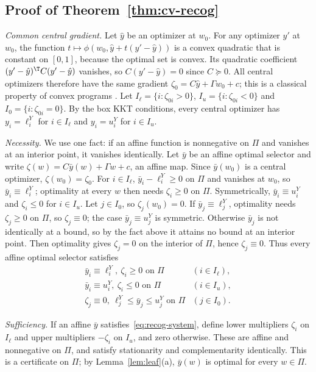 \subsection{Proof of Theorem~\ref{thm:cv-recog}}

\emph{Common central gradient.} Let $\hat y$ be an optimizer at $w_0$. For
any optimizer $y'$ at $w_0$, the function
$t\mapsto\phi(w_0,\hat y+t(y'-\hat y))$ is a convex quadratic that is
constant on $[0,1]$, because the optimal set is convex. Its quadratic
coefficient $(y'-\hat y)^{\T}C(y'-\hat y)$ vanishes, so $C(y'-\hat y)=0$
since $C\succeq0$. All central optimizers therefore have the same gradient
$\zeta_0=C\hat y+\Gamma w_0+c$; this is a classical property of convex
programs \cite{Mangasarian1988}. Let $I_\ell=\{i:\zeta_{0i}>0\}$,
$I_u=\{i:\zeta_{0i}<0\}$ and $I_0=\{i:\zeta_{0i}=0\}$. By the box KKT
conditions, every central optimizer has $y_i=\ell^Y_i$ for $i\in I_\ell$ and
$y_i=u^Y_i$ for $i\in I_u$.

\emph{Necessity.} We use one fact: if an affine function is nonnegative on
$\Pi$ and vanishes at an interior point, it vanishes identically. Let $\bar y$
be an affine optimal selector and write $\zeta(w)=C\bar y(w)+\Gamma w+c$, an
affine map. Since $\bar y(w_0)$ is a central optimizer, $\zeta(w_0)=\zeta_0$.
For $i\in I_\ell$, $\bar y_i-\ell^Y_i\ge0$ on $\Pi$ and vanishes at $w_0$,
so $\bar y_i\equiv\ell^Y_i$; optimality at every $w$ then needs
$\zeta_i\ge0$ on $\Pi$. Symmetrically, $\bar y_i\equiv u^Y_i$ and
$\zeta_i\le0$ for $i\in I_u$. Let $j\in I_0$, so $\zeta_j(w_0)=0$. If
$\bar y_j\equiv\ell^Y_j$, optimality needs $\zeta_j\ge0$ on $\Pi$, so
$\zeta_j\equiv0$; the case $\bar y_j\equiv u^Y_j$ is symmetric. Otherwise
$\bar y_j$ is not identically at a bound, so by the fact above it attains no
bound at an interior point. Then optimality gives $\zeta_j=0$ on the interior
of $\Pi$, hence $\zeta_j\equiv0$. Thus every affine optimal selector
satisfies
\begin{equation}\label{eq:recog-system}
\begin{array}{ll}
\bar y_i\equiv\ell^Y_i,\ \zeta_i\ge0\text{ on }\Pi & (i\in I_\ell),\\
\bar y_i\equiv u^Y_i,\ \zeta_i\le0\text{ on }\Pi & (i\in I_u),\\
\zeta_j\equiv0,\ \ell^Y_j\le\bar y_j\le u^Y_j\text{ on }\Pi & (j\in I_0).
\end{array}
\end{equation}

\emph{Sufficiency.} If an affine $\bar y$ satisfies~\eqref{eq:recog-system},
define lower multipliers $\zeta_i$ on $I_\ell$ and upper multipliers
$-\zeta_i$ on $I_u$, and zero otherwise. These are affine and nonnegative on
$\Pi$, and satisfy stationarity and complementarity identically. This is a
certificate on $\Pi$; by Lemma~\ref{lem:leaf}(a), $\bar y(w)$ is optimal for
every $w\in\Pi$.

